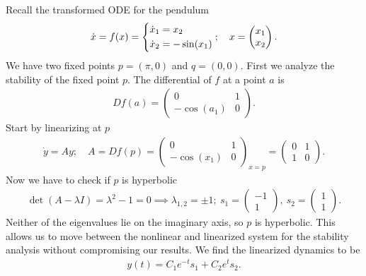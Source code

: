 \begin{ex}
	Recall the transformed ODE for the pendulum
	\begin{align}
		\dot{x}=f(x)=
		\begin{dcases}
		\dot{x}_{1} = x_2 \\ \dot{x}_2 = -\sin(x_1)	
		\end{dcases}
		;\quad {x}  = 
		\begin{pmatrix}
			x_1 \\ x_2
		\end{pmatrix}
		.
	\end{align}
	We have two fixed points ${p} =(\pi ,0)$ and ${q} = (0,0)$. First we analyze the stability of the fixed point ${p} $. The differential of $f$ at a point $a$ is
\begin{align}
	Df(a) =  
		\begin{pmatrix}
			0 & 1 \\
			-\cos(a_1) & 0
		\end{pmatrix}.
\end{align}
	Start by linearizing at ${p} $ 
	\begin{align}
		\dot{{y} } = {Ay};\quad {A}  = Df({p} ) = 
		\begin{pmatrix}
			0 & 1 \\
			- \cos(x_1) & 0
		\end{pmatrix}_{{x} = {p} } =
		\begin{pmatrix}
			0 & 1 \\ 1 & 0
		\end{pmatrix}.
	\end{align}
	Now we have to check if ${p} $ is hyperbolic
	\begin{align}
		\det({A} - \lambda {I} ) = \lambda^2 -1 = 0 \implies \lambda_{1,2} = \pm 1;\ {s_1} =
		\begin{pmatrix}
			-1 \\ 1
		\end{pmatrix}
		,\ {s_2} =
		\begin{pmatrix}
			1 \\ 1
		\end{pmatrix}.
	\end{align}
	Neither of the eigenvalues lie on the imaginary axis, so $p$ is hyperbolic. This allows us to move between the nonlinear and linearized system for the stability analysis without compromising our results. We find the linearized dynamics to be
	\begin{align}
		{y} (t) = C_1 e^{-t} {s_1}  + C_2 e^{t}{s_2}.

\end{align}
\end{ex}
